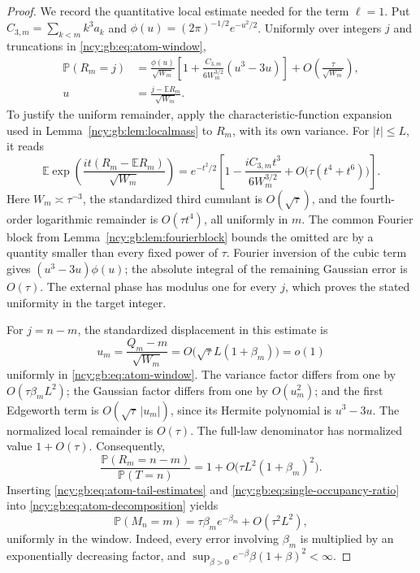 \documentclass[11pt,letterpaper]{article}
\numberwithin{equation}{section}
\theoremstyle{remark}\newtheorem{remark}[theorem]{Remark}
\theoremstyle{definition}\newtheorem{definition}[theorem]{Definition}\theoremstyle{plain}
\newcommand{\E}{\mathbb E}
\newcommand{\Pbb}{\mathbb P}
\begin{document}
\begin{proof}
We record the quantitative local estimate needed for the term $\ell=1$.
Put $C_{3,m}=\sum_{k<m}k^3a_k$ and
$\phi(u)=(2\pi)^{-1/2}e^{-u^2/2}$.  Uniformly over integers $j$ and
truncations in \eqref{ncy:gb:eq:atom-window},
\begin{equation}
\label{ncy:gb:eq:atom-local-edgeworth}
 \begin{split}
 \Pbb(R_m=j)
 &=\frac{\phi(u)}{\sqrt{W_m}}
   \left[1+\frac{C_{3,m}}{6W_m^{3/2}}(u^3-3u)\right]
   +O\left(\frac{\tau}{\sqrt{W_m}}\right),\\
 u&=\frac{j-\E R_m}{\sqrt{W_m}}.
 \end{split}
\end{equation}
To justify the uniform remainder, apply the characteristic-function
expansion used in Lemma~\ref{ncy:gb:lem:localmass} to $R_m$, with its own
variance.  For $|t|\le L$, it reads
\[
 \E\exp\left(\frac{it(R_m-\E R_m)}{\sqrt{W_m}}\right)
 =e^{-t^2/2}\left[
    1-\frac{iC_{3,m}t^3}{6W_m^{3/2}}
        +O\bigl(\tau(t^4+t^6)\bigr)\right].
\]
Here $W_m\asymp\tau^{-3}$, the standardized third cumulant is
$O(\sqrt\tau)$, and the fourth-order logarithmic remainder is
$O(\tau t^4)$, all uniformly in $m$.
The common Fourier block from Lemma~\ref{ncy:gb:lem:fourierblock} bounds
the omitted arc by a quantity smaller than every fixed power of
$\tau$.  Fourier inversion of the cubic term gives
$(u^3-3u)\phi(u)$; the absolute integral of the remaining Gaussian
error is $O(\tau)$.  The external phase has modulus one for every
$j$, which proves the stated uniformity in the target integer.

For $j=n-m$, the standardized displacement in this estimate is
\[
 u_m=\frac{Q_m-m}{\sqrt{W_m}}
     =O\bigl(\sqrt\tau L(1+\beta_m)\bigr)=o(1)
\]
uniformly in \eqref{ncy:gb:eq:atom-window}.  The variance factor
differs from one by $O(\tau\beta_mL^2)$; the Gaussian factor differs
from one by $O(u_m^2)$; and the first Edgeworth term is
$O(\sqrt\tau\,|u_m|)$, since its Hermite polynomial is
$u^3-3u$.  The normalized local remainder is $O(\tau)$.
The full-law denominator has normalized value $1+O(\tau)$.
Consequently,
\begin{equation}
\label{ncy:gb:eq:single-occupancy-ratio}
 \frac{\Pbb(R_m=n-m)}{\Pbb(T=n)}
  =1+O\bigl(\tau L^2(1+\beta_m)^2\bigr).
\end{equation}
Inserting \eqref{ncy:gb:eq:atom-tail-estimates} and
\eqref{ncy:gb:eq:single-occupancy-ratio} into
\eqref{ncy:gb:eq:atom-decomposition} yields
\begin{equation}
\label{ncy:gb:eq:local-largest-component-mass}
 \Pbb(M_n=m)
  =\tau\beta_me^{-\beta_m}+O(\tau^2L^2),
\end{equation}
uniformly in the window.  Indeed, every error involving $\beta_m$
is multiplied by an exponentially decreasing factor, and
$\sup_{\beta>0}e^{-\beta}\beta(1+\beta)^2<\infty$.


\end{proof}
\end{document}
